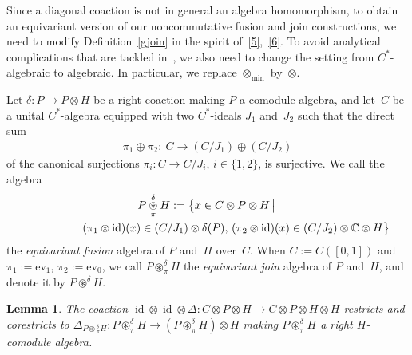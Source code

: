 \documentclass[11pt]{article}
\numberwithin{equation}{section}
\newtheorem{Lemma}[Theorem]{Lemma}
{ \theoremstyle{definition}
\newtheorem{Definition}[Theorem]{Definition}
\newtheorem{Example}[Theorem]{Example}}
\begin{document}
Since a diagonal coaction is not in general an algebra homomorphism,
to obtain an equivariant version of our noncommutative fusion and join constructions,
we need to modify  Def\/inition~\ref{gjoin}
in the spirit of~\eqref{5},~\eqref{6}.
To avoid analytical complications that
are tackled in~\cite{ddhw}, we also need to change the setting from $C^*$-algebraic to algebraic. In particular,
we replace $\otimes_{\min}$ by~$\otimes$.

\begin{Definition}\label{pjoin}
Let $\delta\colon P\to P\otimes H$ be a right coaction making $P$ a comodule algebra, and
let~$C$ be a unital $C^*$-algebra equipped with two $C^*$-ideals $J_1$ and~$ J_2$
such that the direct sum
\begin{gather*}
\pi_1\oplus\pi_2\colon \ C\longrightarrow (C/J_1) \oplus (C/J_2)
\end{gather*}
of the canonical surjections $\pi_i\colon C\to C/J_i$, $i\in \{1,2\}$, is surjective. We call the algebra
\begin{gather*}
P \underset{\pi}{\overset{\delta}{\circledast}} H :=
\big\{x\in C \otimes P \otimes H \,
\big|\, \\
\hphantom{P \underset{\pi}{\overset{\delta}{\circledast}} H :=\big\{}{}
(\pi_1\otimes \operatorname{id})(x) \in (C/J_1)\otimes \delta (P) ,\,
(\pi_2\otimes \operatorname{id})(x) \in (C/J_2) \otimes \mathbb{C} \otimes H\big\}
\end{gather*}
the \emph{equivariant fusion} algebra of $P$ and~$H$ over~$C$.
When $C:=C([0,1])$  and
$\pi_1:=\mathrm{ev}_1$, $\pi_2:=\mathrm{ev}_0$,
we call $P \circledast^\delta_\pi H$ the \emph{equivariant join} algebra of $P$ and~$H$,
and denote it by $P \circledast^\delta H$.
\end{Definition}

\begin{Lemma}
The coaction $\operatorname{id}\otimes\operatorname{id}\otimes\Delta\colon
C\otimes P\otimes H\to C\otimes P\otimes H\otimes H$
restricts and corestricts to $\Delta_{P\circledast{}^\delta_\pi H}\colon P{\circledast}^\delta_\pi   H
\to (P{\circledast}^\delta_\pi H)\otimes H$ making $P{\circledast}^\delta_\pi H$
a right $H$-comodule algebra.
\end{Lemma}
\end{document}
